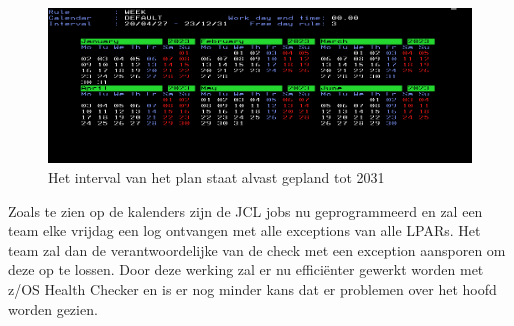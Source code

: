 \begin{figure}[h]
	\centering
	\includegraphics[width=1\linewidth]{img/Caleder2030}
	\caption[Kalender IWS 2030]{Het interval van het plan staat alvast gepland tot 2031}
	\label{fig:caleder2030}
\end{figure}

Zoals te zien op de kalenders zijn de JCL jobs nu geprogrammeerd en zal een team elke vrijdag een log ontvangen met alle exceptions van alle LPARs. Het team zal dan de verantwoordelijke van de check met een exception aansporen om deze op te lossen. Door deze werking zal er nu efficiënter gewerkt worden met z/OS Health Checker en is er nog minder kans dat er problemen over het hoofd worden gezien.
